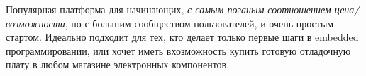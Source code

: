 \clearpage
{}\label{arduino}

Популярная платформа для начинающих, \emph{с самым поганым соотношением
цена/возможности}, но с большим сообществом пользователей, и очень простым
стартом. Идеально подходит для тех, кто делает только первые шаги в embedded
программировании, или хочет иметь вхозможность купить готовую отладочную плату в
любом магазине электронных компонентов.

